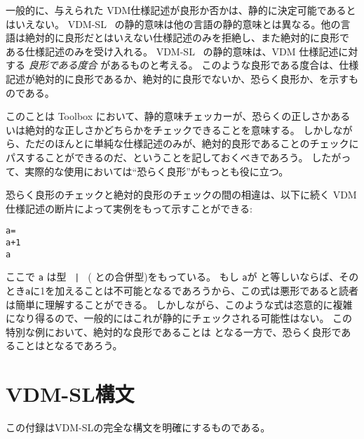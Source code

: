 \documentclass[\pformat,12pt]{jarticle}
\newcommand{\vdmslpp}[2]{%
#1
}
\newcommand{\vdmsl}{VDM-SL}
\newcommand{\vdmpp}{VDM++}
\begin{document}
一般的に、与えられた VDM仕様記述が良形か否かは、静的に決定可能であるとはいえない。
\vdmslpp{\vdmsl}{\vdmpp}\ の静的意味は他の言語の静的意味とは異なる。他の言語は絶対的に良形だとはいえない仕様記述のみを拒絶し、また絶対的に良形で
ある仕様記述のみを受け入れる。 
\vdmslpp{\vdmsl}{\vdmpp}\ の静的意味は、VDM 仕様記述に対する {\em 良形である度合} があるものと考える。
このような良形である度合は、仕様記述が絶対的に良形であるか、絶対的に良形でないか、恐らく良形か、を示すものである。

このことは Toolbox において、静的意味チェッカーが、恐らくの正しさかあるいは絶対的な正しさかどちらかをチェックできることを意味する。
しかしながら、ただのほんとに単純な仕様記述のみが、絶対的良形であることのチェックにパスすることができるのだ、ということを記しておくべきであろう。
したがって、実際的な使用においては``恐らく良形''がもっとも役に立つ。

恐らく良形のチェックと絶対的良形のチェックの間の相違は、以下に続く VDM 仕様記述の断片によって実例をもって示すことができる:
\begin{alltt}
    a =  
    a + 1 
     a
\end{alltt}
ここで {\tt a} は型 {\tt {} | } ( との合併型)をもっている。 
もし {\tt a}が  と等しいならば、そのとき{\tt a}に1を加えることは不可能となるであろうから、この式は悪形であると読者は簡単に理解することができる。
しかしながら、このような式は恣意的に複雑になり得るので、一般的にはこれが静的にチェックされる可能性はない。
この特別な例において、絶対的な良形であることは  となる一方で、恐らく良形であることはとなるであろう。



\newpage


%


\newpage
\appendix


\section{VDM-SL構文} \label{app-a} この付録はVDM-SLの完全な構文を明確にするものである。
\end{document}
